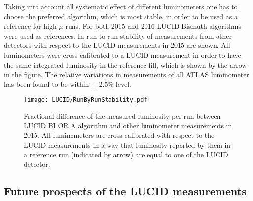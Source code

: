 
Taking into account all systematic effect of different luminometers one has to choose the preferred algorithm, which is most stable, in order to be used as a reference for high-$\mu$ runs.
For both 2015 and 2016 LUCID Bismuth algorithms were used as references. In  run-to-run stability of measurements from other detectors with respect to the 
LUCID measurements in 2015 are shown. 
All luminometers were cross-calibrated to a LUCID measurement in order to have the same integrated luminosity in the reference fill, which is shown by the arrow in the figure.
The relative variations in measurements of all ATLAS luminometer has been found to be within $\pm$ 2.5$\%$ level.

\begin{figure}
\centering
\texttt{[image: LUCID/RunByRunStability.pdf]}
\caption{
Fractional difference of the measured luminosity per run between LUCID BI$\_$OR$\_$A algorithm and other luminometer measurements in 2015.
All luminometers are cross-calibrated with respect to the LUCID measurements in a way that luminosity reported by them in a reference run (indicated by arrow) are
equal to one of the LUCID detector.
}
\label{fig:runByRunStability}
\end{figure}


\subsection{Future prospects of the LUCID measurements}

